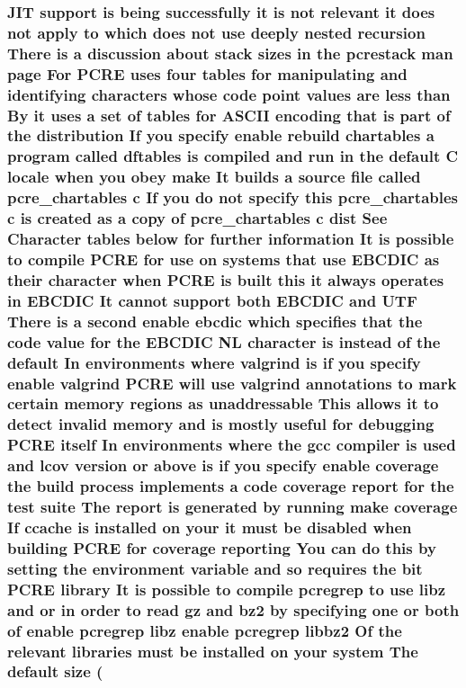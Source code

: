 \subsubsection[{\texorpdfstring{size(in bytes) of the internal buffer used by pcregrep can be set by}{size(in bytes) of the internal buffer used by pcregrep can be set by}}]{ J\+IT {\bf support} {\bf is} being successfully {\bf it} {\bf is} {\bf not} relevant {\bf it} does {\bf not} apply {\bf to} {\bf which} does {\bf not} use deeply nested {\bf recursion} There {\bf is} {\bf a} discussion about {\bf stack} sizes {\bf in} the pcrestack {\bf man} page For {\bf P\+C\+RE} uses four {\bf tables} for manipulating and identifying {\bf characters} whose {\bf code} {\bf point} {\bf values} {\bf are} less {\bf than} By {\bf it} uses {\bf a} {\bf set} {\bf of} {\bf tables} for {\bf A\+S\+C\+II} {\bf encoding} that {\bf is} part {\bf of} the distribution If you specify enable rebuild {\bf chartables} {\bf a} {\bf program} called {\bf dftables} {\bf is} {\bf compiled} and {\bf run} {\bf in} the {\bf default} {\bf C} {\bf locale} when you obey {\bf make} It builds {\bf a} {\bf source} {\bf file} called pcre\+\_\+chartables {\bf c} If you {\bf do} {\bf not} specify {\bf this} pcre\+\_\+chartables {\bf c} {\bf is} created {\bf as} {\bf a} copy {\bf of} pcre\+\_\+chartables {\bf c} {\bf dist} See Character {\bf tables} {\bf below} for further information It {\bf is} {\bf possible} {\bf to} {\bf compile} {\bf P\+C\+RE} for use {\bf on} {\bf systems} that use E\+B\+C\+D\+IC {\bf as} their {\bf character} when {\bf P\+C\+RE} {\bf is} {\bf built} {\bf this} {\bf it} always operates {\bf in} E\+B\+C\+D\+IC It cannot {\bf support} both E\+B\+C\+D\+IC and U\+TF There {\bf is} {\bf a} {\bf second} enable ebcdic {\bf which} specifies that the {\bf code} {\bf value} for the E\+B\+C\+D\+IC {\bf NL} {\bf character} {\bf is} instead {\bf of} the {\bf default} In {\bf environments} {\bf where} valgrind {\bf is} {\bf if} you specify enable valgrind {\bf P\+C\+RE} will use valgrind annotations {\bf to} {\bf mark} certain {\bf memory} regions {\bf as} unaddressable This allows {\bf it} {\bf to} detect invalid {\bf memory} and {\bf is} mostly useful for debugging {\bf P\+C\+RE} {\bf itself} In {\bf environments} {\bf where} the {\bf gcc} {\bf compiler} {\bf is} {\bf used} and lcov version {\bf or} {\bf above} {\bf is} {\bf if} you specify enable coverage the build {\bf process} implements {\bf a} {\bf code} coverage report for the test suite The report {\bf is} {\bf generated} by running {\bf make} coverage If ccache {\bf is} {\bf installed} {\bf on} your {\bf it} must {\bf be} disabled when building {\bf P\+C\+RE} for coverage reporting You {\bf can} {\bf do} {\bf this} by {\bf setting} the {\bf environment} variable and {\bf so} requires the {\bf bit} {\bf P\+C\+RE} {\bf library} It {\bf is} {\bf possible} {\bf to} {\bf compile} pcregrep {\bf to} use libz and {\bf or} {\bf in} {\bf order} {\bf to} {\bf read} gz and {\bf bz2} by {\bf specifying} one {\bf or} both {\bf of} enable pcregrep libz enable pcregrep {\bf libbz2} Of the relevant {\bf libraries} must {\bf be} {\bf installed} {\bf on} your {\bf system} The {\bf default} size (
}
